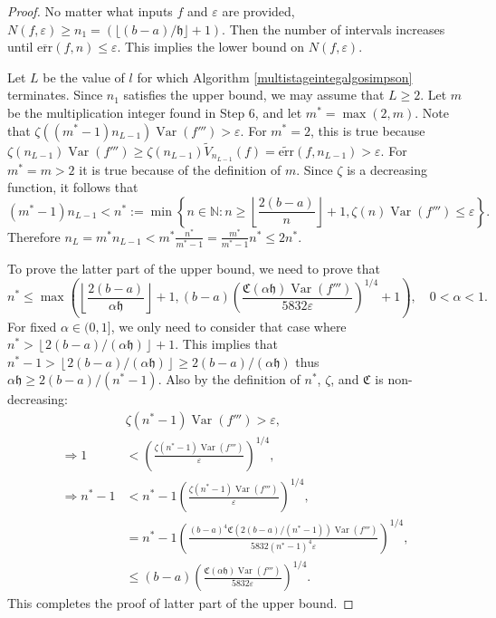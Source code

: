 \documentclass{iitthesis}
\DeclareMathOperator{\Var}{Var}
\theoremstyle{definition}
\theoremstyle{remark}
\begin{document}
\begin{proof}
  No matter what inputs $f$ and $\varepsilon$ are provided, $N(f,\varepsilon)\ge n_1=(\lfloor (b-a)/\mathfrak{h}\rfloor+1)$. Then the number of intervals increases until $\overline{\text{err}}(f,n)\le\varepsilon$. This implies the lower bound on $N(f,\varepsilon)$.

  Let $L$ be the value of $l$ for which Algorithm \ref{multistageintegalgosimpson} terminates. Since $n_1$ satisfies the upper bound, we may assume that $L \ge 2$. Let $m$ be the multiplication integer found in Step 6, and let $m^*=\max(2,m)$. Note that $\zeta((m^*-1)n_{L-1})\Var(f''')>\varepsilon$. For $m^*=2$, this is true because $\zeta(n_{L-1})\Var(f''')\ge\zeta(n_{L-1})\widetilde{V}_{n_{L-1}}(f)=\widetilde{\text{err}}(f,n_{L-1})>\varepsilon$. For $m^*=m>2$ it is true because of the definition of $m$. Since $\zeta$ is a decreasing function, it follows that
  $$(m^*-1)n_{L-1}<n^*:=\min\left\{n\in\mathbb{N}:n\ge\left\lfloor\frac{2(b-a)}{n}\right\rfloor+1,\zeta(n)\Var(f''')\le\varepsilon\right\}.$$
  Therefore $n_L=m^*n_{L-1}<m^*\frac{n^*}{m^*-1}=\frac{m^*}{m^*-1}n^*\le2n^*$.

  To prove the latter part of the upper bound, we need to prove that
  $$n^*\leq\max\left(\left\lfloor\frac{2(b-a)}{\alpha\mathfrak{h}}\right\rfloor+1,(b-a)\left(\frac{\mathfrak{C}(\alpha\mathfrak{h})\Var(f''')}{5832\varepsilon}\right)^{1/4}+1\right),\quad 0<\alpha<1.$$
  For fixed $\alpha\in(0,1]$, we only need to consider that case where $n^*>\left\lfloor2(b-a)/(\alpha\mathfrak{h})\right\rfloor+1$. This implies that $n^*-1>\left\lfloor2(b-a)/(\alpha\mathfrak{h})\right\rfloor\ge 2(b-a)/(\alpha\mathfrak{h})$ thus $\alpha\mathfrak{h}\ge2(b-a)/(n^*-1)$. Also by the definition of $n^*$, $\zeta$, and $\mathfrak{C}$ is non-decreasing:
  \begin{align*}
    &\zeta(n^*-1)\Var(f''')>\varepsilon, \\
    \Rightarrow 1&<\left(\frac{\zeta(n^*-1)\Var(f''')}{\varepsilon}\right)^{1/4},\\
    \Rightarrow n^*-1&<n^*-1\left(\frac{\zeta(n^*-1)\Var(f''')}{\varepsilon}\right)^{1/4},\\
    &=n^*-1\left(\frac{(b-a)^4\mathfrak{C}(2(b-a)/(n^*-1))\Var(f''')}{5832(n^*-1)^4\varepsilon}\right)^{1/4},\\
    &\le(b-a)\left(\frac{\mathfrak{C}(\alpha\mathfrak{h})\Var(f''')}{5832\varepsilon}\right)^{1/4}.
  \end{align*}
  This completes the proof of latter part of the upper bound.
\end{proof}
\end{document}
